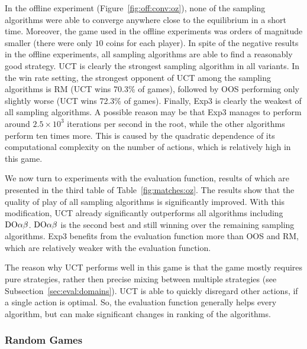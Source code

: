 In the offline experiment (Figure~\ref{fig:off:conv:oz}), none of the sampling algorithms were able to converge anywhere close to the equilibrium in a short time. Moreover, the game used in the offline experiments was orders of magnitude smaller (there were only $10$ coins for each player).
In spite of the negative results in the offline experiments, all sampling algorithms are able to find a reasonably good strategy.
UCT is clearly the strongest sampling algorithm in all variants.
In the win rate setting, the strongest opponent of UCT among the sampling algorithms is RM (UCT wins 70.3\% of games), followed by OOS performing only slightly worse (UCT wins 72.3\% of games).
Finally, Exp3 is clearly the weakest of all sampling algorithms.
A possible reason may be that Exp3 manages to perform around $2.5 \times 10^3$ iterations per second in the root, while the other algorithms perform ten times more. 
This is caused by the quadratic dependence of its computational complexity on the number of actions, which is relatively high in this game.

We now turn to experiments with the evaluation function, results of which are presented in the third table of Table~\ref{fig:matches:oz}.
The results show that the quality of play of all sampling algorithms is significantly improved.
With this modification, UCT already significantly outperforms all algorithms including $\textrm{DO}\alpha\beta$.
$\textrm{DO}\alpha\beta$ is the second best and still winning over the remaining sampling algorithms.
Exp3 benefits from the evaluation function more than OOS and RM, which are relatively weaker with the evaluation function.

The reason why UCT performs well in this game is that the game mostly requires pure strategies, rather then precise mixing between multiple strategies (see Subsection~\ref{sec:eval:domains}). UCT is able to quickly disregard other actions, if a single action is optimal.
So, the evaluation function generally helps every algorithm, but can make significant changes in ranking of the algorithms. 

\subsubsection{Random Games}

